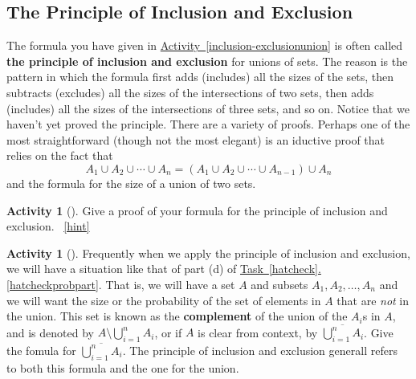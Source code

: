 \documentclass[10pt,]{book}
\newcommand{\terminology}[1]{\textbf{#1}}
\theoremstyle{plain}
\theoremstyle{definition}
\theoremstyle{definition}
\theoremstyle{definition}
\newtheorem{activity}[project]{Activity}
\numberwithin{equation}{chapter}
\begin{document}
\subsection[{The Principle of Inclusion and Exclusion}]{The Principle of Inclusion and Exclusion}\label{subsection-17}
\hypertarget{p-781}{}%
The formula you have given in \hyperref[inclusion-exclusionunion]{Activity~\ref{inclusion-exclusionunion}} is often called \terminology{the principle of inclusion and exclusion} for unions of sets. The reason is the pattern in which the formula first adds (includes) all the sizes of the sets, then subtracts (excludes) all the sizes of the intersections of two sets, then adds (includes) all the sizes of the intersections of three sets, and so on.   Notice that we haven't yet proved the principle. There are a variety of proofs.  Perhaps one of the most straightforward (though not the most elegant) is an iductive proof that relies on the fact that%
\begin{equation*}
A_1 \cup A_2 \cup \cdots \cup A_n = \left(A_1 \cup A_2 \cup \cdots \cup A_{n-1}\right) \cup A_n
\end{equation*}
and the formula for the size of a union of two sets.%
\begin{activity}[]\label{activity-161}
\hypertarget{p-782}{}%
Give a proof of your formula for the principle of inclusion and exclusion.%
~\hfill{\tiny\hyperlink{a-161}{[hint]}\hypertarget{q-161}{}}\end{activity}
\begin{activity}[]\label{compunion}
\hypertarget{p-786}{}%
Frequently when we apply the principle of inclusion and exclusion, we will have a situation like that of part (d) of \hyperref[hatcheckprobpart]{Task~\ref{hatcheck}.\ref{hatcheckprobpart}}.  That is, we will have a set \(A\) and subsets \(A_1, A_2, \ldots, A_n\) and we will want the size or the probability of the set of elements in \(A\) that are \emph{not} in the union.  This set is known as the \terminology{complement}  of the union of the \(A_i\)s in \(A\), and is denoted by \(A \setminus \bigcup_{i=1}^n A_i\), or if \(A\) is clear from context, by \(\overline{\bigcup_{i=1}^n A_i}\). Give the fomula for \(\overline{\bigcup_{i=1}^n A_i}\).  The principle of inclusion and exclusion generall refers to both this formula and the one for the union.%
\end{activity}
\hypertarget{p-788}{}%
\end{document}
